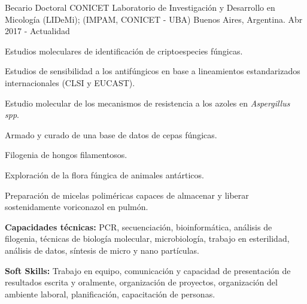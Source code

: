 

\begin{cventries}

  \cventry
    {Becario Doctoral CONICET} %
    {Laboratorio de Investigación y Desarrollo en Micología (LIDeMi); (IMPAM, CONICET - UBA)} %
    {Buenos Aires, Argentina.} %
    {Abr 2017 - Actualidad} %
    {
      \begin{cvitems} %
        \item {Estudios moleculares de identificación de criptoespecies fúngicas.}
        \item {Estudios de sensibilidad a los antifúngicos en base a lineamientos estandarizados internacionales (CLSI y EUCAST).}
        \item {Estudio molecular de los mecanismos de resistencia a los azoles en \textit{Aspergillus spp}.}
        \item {Armado y curado de una base de datos de cepas fúngicas.}
        \item {Filogenia de hongos filamentosos.}
        \item {Exploración de la flora fúngica de animales antárticos.}
        \item {Preparación de micelas poliméricas capaces de almacenar y liberar sostenidamente voriconazol en pulmón.}
        \item {\textbf{Capacidades técnicas:} PCR, secuenciación, bioinformática, análisis de filogenia, técnicas de biología molecular, microbiología, trabajo en esterilidad, análisis de datos, síntesis de micro y nano partículas.}
        \item {\textbf{Soft Skills:} Trabajo en equipo, comunicación y capacidad de presentación de resultados escrita y oralmente, organización de proyectos, organización del ambiente laboral, planificación, capacitación de personas.}
      \end{cvitems}
    }


\end{cventries}
